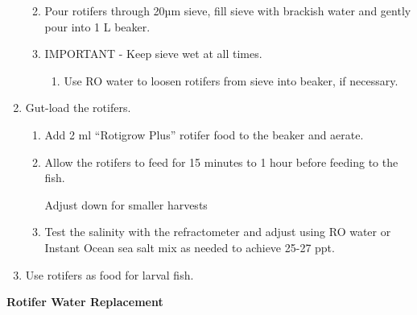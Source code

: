 \documentclass[
  letterpaper,
  DIV=11,
  numbers=noendperiod]{scrreprt}
\providecommand{\tightlist}{%
  \setlength{\itemsep}{0pt}\setlength{\parskip}{0pt}}\usepackage{longtable,booktabs,array}
\begin{document}
\begin{enumerate}
  \begin{enumerate}
  \def\labelenumii{\arabic{enumii}.}
  \tightlist
  \item
    Pour rotifers through 20µm sieve, fill sieve with brackish water and
    gently pour into 1 L beaker.
  \item
    IMPORTANT - Keep sieve wet at all times.

    \begin{enumerate}
    \def\labelenumiii{\arabic{enumiii}.}
    \tightlist
    \item
      Use RO water to loosen rotifers from sieve into beaker, if
      necessary.
    \end{enumerate}
  \end{enumerate}
\item
  Gut-load the rotifers.

  \begin{enumerate}
  \def\labelenumii{\arabic{enumii}.}
  \item
    Add 2 ml ``Rotigrow Plus'' rotifer food to the beaker and aerate.
  \item
    Allow the rotifers to feed for 15 minutes to 1 hour before feeding
    to the fish.

    \begin{tcolorbox}[enhanced jigsaw, toprule=.15mm, breakable, coltitle=black, leftrule=.75mm, title=\textcolor{quarto-callout-warning-color}{\faExclamationTriangle}\hspace{0.5em}{NOTES}, bottomrule=.15mm, toptitle=1mm, bottomtitle=1mm, colframe=quarto-callout-warning-color-frame, opacityback=0, colback=white, opacitybacktitle=0.6, colbacktitle=quarto-callout-warning-color!10!white, rightrule=.15mm, titlerule=0mm, arc=.35mm, left=2mm]

    Adjust down for smaller harvests

    \end{tcolorbox}
  \item
    Test the salinity with the refractometer and adjust using RO water
    or Instant Ocean sea salt mix as needed to achieve 25-27 ppt.
  \end{enumerate}
\item
  Use rotifers as food for larval fish.
\end{enumerate}

\textbf{Rotifer Water Replacement}
\end{document}
